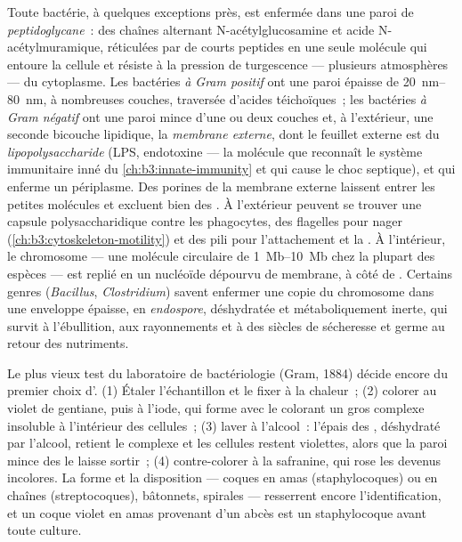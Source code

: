 \begin{definition}[L'enveloppe]\label{def:b3:bacteriology:envelope}
Toute bactérie, à quelques exceptions près, est enfermée dans une paroi
de \emph{peptidoglycane}~: des chaînes alternant N-acétylglucosamine et
acide N-acétylmuramique, réticulées par de courts peptides en une seule
molécule qui entoure la cellule et résiste à la pression de turgescence
--- plusieurs atmosphères --- du cytoplasme. Les bactéries \emph{à Gram
positif} ont une paroi épaisse de \qtyrange{20}{80}{nm}, à nombreuses
couches, traversée d'acides téichoïques~; les bactéries \emph{à Gram
négatif} ont une paroi mince d'une ou deux couches et, à l'extérieur,
une seconde bicouche lipidique, la \emph{membrane externe}, dont le
feuillet externe est du \emph{lipopolysaccharide} (LPS, endotoxine ---
la molécule que reconnaît le système immunitaire inné du
\cref{ch:b3:innate-immunity} et qui cause le choc septique), et qui
enferme un périplasme. Des porines de la membrane externe laissent
entrer les petites molécules et excluent bien des . À
l'extérieur peuvent se trouver une capsule polysaccharidique contre les
phagocytes, des flagelles pour nager
(\cref{ch:b3:cytoskeleton-motility}) et des pili pour l'attachement et
la . À l'intérieur, le chromosome --- une molécule
circulaire de \qtyrange{1}{10}{Mb} chez la plupart des espèces --- est
replié en un nucléoïde dépourvu de membrane, à côté de .
Certains genres (\emph{Bacillus}, \emph{Clostridium}) savent enfermer
une copie du chromosome dans une enveloppe épaisse, en
\emph{endospore}, déshydratée et métaboliquement inerte, qui survit à
l'ébullition, aux rayonnements et à des siècles de sécheresse et germe
au retour des nutriments.
\end{definition}

\begin{method}\label{met:b3:bacteriology:gram}
Le plus vieux test du laboratoire de bactériologie (Gram, 1884) décide
encore du premier choix d'. (1) Étaler l'échantillon et le
fixer à la chaleur~; (2) colorer au violet de gentiane, puis à l'iode,
qui forme avec le colorant un gros complexe insoluble à l'intérieur des
cellules~; (3) laver à l'alcool~: l'épais  des , déshydraté par l'alcool, retient le complexe et les cellules
restent violettes, alors que la paroi mince des  le laisse
sortir~; (4) contre-colorer à la safranine, qui rose les 
devenus incolores. La forme et la disposition --- coques en amas
(staphylocoques) ou en chaînes (streptocoques), bâtonnets, spirales ---
resserrent encore l'identification, et un coque violet en amas provenant
d'un abcès est un staphylocoque avant toute culture.
\end{method}


